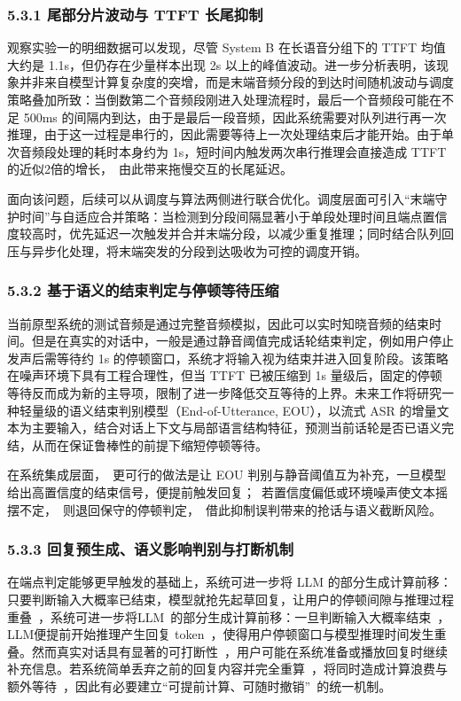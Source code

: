 \documentclass[UTF8,a4paper,12pt]{ctexart}
\begin{document}
\subsubsection*{5.3.1 尾部分片波动与 TTFT 长尾抑制}


观察实验一的明细数据可以发现，尽管 System B 在长语音分组下的 TTFT 均值大约是 1.1s，但仍存在少量样本出现 2s 以上的峰值波动。进一步分析表明，该现象并非来自模型计算复杂度的突增，而是末端音频分段的到达时间随机波动与调度策略叠加所致：当倒数第二个音频段刚进入处理流程时，最后一个音频段可能在不足 500ms 的间隔内到达，由于是最后一段音频，因此系统需要对队列进行再一次推理，由于这一过程是串行的，因此需要等待上一次处理结束后才能开始。由于单次音频段处理的耗时本身约为 1s，短时间内触发两次串行推理会直接造成 TTFT 的近似2倍的增长， 由此带来拖慢交互的长尾延迟。

面向该问题，后续可以从调度与算法两侧进行联合优化。调度层面可引入“末端守护时间”与自适应合并策略：当检测到分段间隔显著小于单段处理时间且端点置信度较高时，优先延迟一次触发并合并末端分段，以减少重复推理；同时结合队列回压与异步化处理，将末端突发的分段到达吸收为可控的调度开销。

\subsubsection*{5.3.2 基于语义的结束判定与停顿等待压缩}


当前原型系统的测试音频是通过完整音频模拟，因此可以实时知晓音频的结束时间。但是在真实的对话中，一般是通过静音阈值完成话轮结束判定，例如用户停止发声后需等待约 1s 的停顿窗口，系统才将输入视为结束并进入回复阶段。该策略在噪声环境下具有工程合理性，但当 TTFT 已被压缩到 1s 量级后，固定的停顿等待反而成为新的主导项，限制了进一步降低交互等待的上界。未来工作将研究一种轻量级的语义结束判别模型（End-of-Utterance, EOU），以流式 ASR 的增量文本为主要输入，结合对话上下文与局部语言结构特征，预测当前话轮是否已语义完结，从而在保证鲁棒性的前提下缩短停顿等待。

在系统集成层面， 更可行的做法是让 EOU 判别与静音阈值互为补充，一旦模型给出高置信度的结束信号，便提前触发回复； 若置信度偏低或环境噪声使文本摇摆不定， 则退回保守的停顿判定， 借此抑制误判带来的抢话与语义截断风险。

\subsubsection*{5.3.3 回复预生成、语义影响判别与打断机制}


在端点判定能够更早触发的基础上，系统可进一步将 LLM 的部分生成计算前移：只要判断输入大概率已结束，模型就抢先起草回复，让用户的停顿间隙与推理过程重叠 ，系统可进一步将LLM 的部分生成计算前移：一旦判断输入大概率结束 ，LLM便提前开始推理产生回复 token ，使得用户停顿窗口与模型推理时间发生重叠。然而真实对话具有显著的可打断性 ，用户可能在系统准备或播放回复时继续补充信息。若系统简单丢弃之前的回复内容并完全重算 ，将同时造成计算浪费与额外等待 ，因此有必要建立“可提前计算、可随时撤销” 的统一机制。
\end{document}
